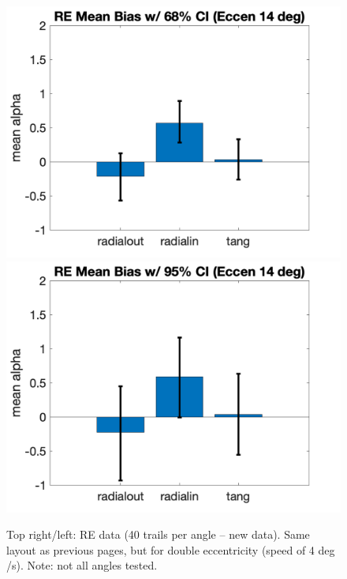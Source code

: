 \documentclass[11pt]{article} %
\begin{document}
\begin{figure}[H]
\includegraphics[scale=.2]{Images/MeanBiasError_68ci_RE_eccen14.png}
\includegraphics[scale=.2]{Images/MeanBiasError_95ci_RE_eccen14.png}
\caption{Top right/left: RE data (40 trails per angle -- new data).  Same layout as previous pages, but for double eccentricity (speed of 4 deg /s). Note: not all angles tested.}
\end{figure}

\newpage
\end{document}
